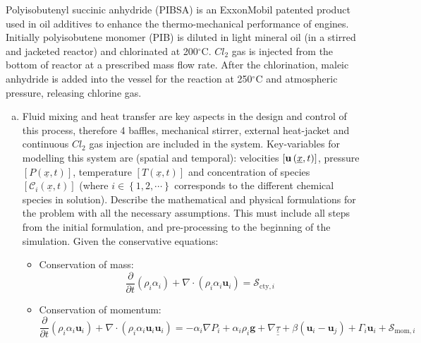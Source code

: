 \documentclass[calculator,datasheet]{exam}
\newcommand{\frc}{\displaystyle\frac}
\begin{document}
\clearpage

\begin{question}
Polyisobutenyl succinic anhydride (PIBSA) is an ExxonMobil patented product used in oil additives to enhance the thermo-mechanical performance of engines. Initially polyisobutene monomer (PIB) is diluted in light mineral oil (in a stirred and jacketed reactor) and chlorinated at 200$^{\circ}$C. $Cl_{2}$ gas is injected from the bottom of reactor at a prescribed mass flow rate. After the chlorination, maleic anhydride is added into the vessel for the reaction at 250$^{\circ}$C and atmospheric pressure, releasing chlorine gas.
\begin{enumerate}[(a)]
\item Fluid mixing and heat transfer are key aspects in the design and control of this process, therefore 4 baffles, mechanical stirrer, external heat-jacket and continuous $Cl_{2}$ gas injection are included in the system. Key-variables for modelling this system are (spatial and temporal): velocities $\left[{\bf u}\left(\underline{x},t\right)\right]$, pressure $\left[P\left(\underline{x},t\right)\right]$, temperature $\left[T\left(\underline{x},t\right)\right]$ and concentration of species $\left[\mathcal{C}_{i}\left(\underline{x},t\right)\right]$ (where $i\in\left\{1,2,\cdots\right\}$ corresponds to the different chemical species in solution). Describe the mathematical and physical formulations for the problem with all the necessary assumptions. This must include all steps from the initial formulation, and pre-processing to the beginning of the simulation. Given the conservative equations:
\begin{itemize}
\item Conservation of mass:
\begin{displaymath}
\frc{\partial}{\partial t}\left(\rho_{i}\alpha_{i}\right) + \nabla\cdot\left(\rho_{i}\alpha_{i}\mathbf{u}_{i}\right)=\mathcal{S}_{\text{cty},i}
\end{displaymath}

\item Conservation of momentum:
\begin{displaymath}
\frc{\partial}{\partial t}\left(\rho_{i}\alpha_{i}\mathbf{u}_{i}\right) + \nabla\cdot\left(\rho_{i}\alpha_{i}\mathbf{u}_{i}\mathbf{u}_{i}\right) = -\alpha_{i}\nabla P_{i} + \alpha_{i}\rho_{i}\mathbf{g} + \nabla\underline{\underline{\tau}} +\beta\left(\mathbf{u}_{i}-\mathbf{u}_{j}\right) + \Gamma_{i}\mathbf{u}_{i} + \mathcal{S}_{\text{mom},i}
\end{displaymath}


\end{itemize}
\end{enumerate}
\end{question}
\end{document}
